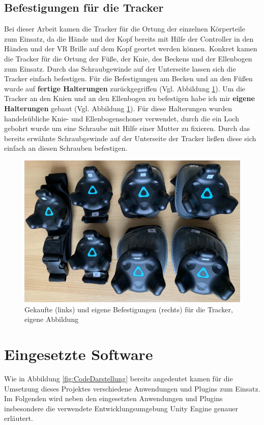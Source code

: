 \subsection{Befestigungen für die Tracker}\label{sec:TrackerBefestigung}
Bei dieser Arbeit kamen die Tracker für die Ortung der einzelnen Körperteile zum Einsatz, da die Hände und der Kopf bereits mit Hilfe der Controller in den Händen und der VR Brille auf dem Kopf geortet werden können. Konkret kamen die Tracker für die Ortung der Füße, der Knie, des Beckens und der Ellenbogen zum Einsatz. Durch das Schraubgewinde auf der Unterseite lassen sich die Tracker einfach befestigen. Für die Befestigungen am Becken und an den Füßen wurde auf \textbf{fertige Halterungen} zurückgegriffen (Vgl. Abbildung \ref{fig:Mounts}). Um die Tracker an den Knien und an den Ellenbogen zu befestigen habe ich mir \textbf{eigene Halterungen} gebaut (Vgl. Abbildung \ref{fig:Mounts}). Für diese Halterungen wurden handelsübliche Knie- und Ellenbogenschoner verwendet, durch die ein Loch gebohrt wurde um eine Schraube mit Hilfe einer Mutter zu fixieren. Durch das bereits erwähnte Schraubgewinde auf der Unterseite der Tracker ließen diese sich einfach an diesen Schrauben befestigen.
\begin{figure}[h]
	\centering
	\includegraphics[width=0.6\linewidth]{Bilder/A32_Mounts}
	\caption{Gekaufte (links) und eigene Befestigungen (rechts) für die Tracker, eigene Abbildung}
	\label{fig:Mounts}
\end{figure}

\section{Eingesetzte Software}\label{sec:Software}
Wie in Abbildung \ref{fig:CodeDarstellung} bereits angedeutet kamen für die Umsetzung dieses Projektes verschiedene Anwendungen und Plugins zum Einsatz. Im Folgenden wird neben den eingesetzten Anwendungen und Plugins insbesondere die verwendete Entwicklungsumgebung Unity Engine genauer erläutert.

